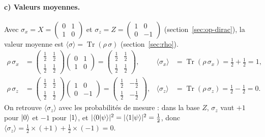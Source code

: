 \paragraph{c) Valeurs moyennes.} Avec $\sigma_x=X=\begin{pmatrix}0&1\\1&0\end{pmatrix}$ et
$\sigma_z=Z=\begin{pmatrix}1&0\\0&-1\end{pmatrix}$ (section~\ref{sec:op-dirac}), la valeur
moyenne est $\langle\sigma\rangle=\operatorname{Tr}(\rho\,\sigma)$ (section~\ref{sec:rho}).
\begin{align*}
  \rho\,\sigma_x&=\begin{pmatrix}\frac12&\frac12\\[0.4ex]\frac12&\frac12\end{pmatrix}
     \begin{pmatrix}0&1\\1&0\end{pmatrix}
     =\begin{pmatrix}\frac12&\frac12\\[0.4ex]\frac12&\frac12\end{pmatrix},
     &\langle\sigma_x\rangle&=\operatorname{Tr}(\rho\,\sigma_x)=\tfrac12+\tfrac12=1,\\[1.5ex]
  \rho\,\sigma_z&=\begin{pmatrix}\frac12&\frac12\\[0.4ex]\frac12&\frac12\end{pmatrix}
     \begin{pmatrix}1&0\\0&-1\end{pmatrix}
     =\begin{pmatrix}\frac12&-\frac12\\[0.4ex]\frac12&-\frac12\end{pmatrix},
     &\langle\sigma_z\rangle&=\operatorname{Tr}(\rho\,\sigma_z)=\tfrac12-\tfrac12=0.
\end{align*}
On retrouve $\langle\sigma_z\rangle$ avec les probabilités de mesure : dans la base $Z$,
$\sigma_z$ vaut $+1$ pour $|0\rangle$ et $-1$ pour $|1\rangle$, et
$|\langle 0|\psi\rangle|^2=|\langle 1|\psi\rangle|^2=\frac12$, donc
$\langle\sigma_z\rangle=\frac12\times(+1)+\frac12\times(-1)=0$.

